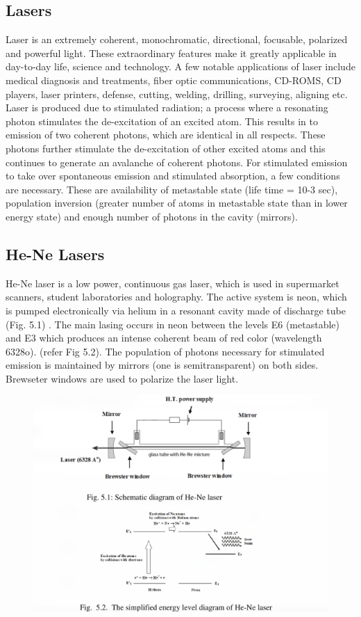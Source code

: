 \documentclass[11pt]{article}
\begin{document}
	\subsection{Lasers}
	Laser is an extremely coherent, monochromatic, directional, focusable, polarized and
powerful light. These extraordinary features make it greatly applicable in day-to-day life, science
and technology. A few notable applications of laser include medical diagnosis and treatments,
fiber optic communications, CD-ROMS, CD players, laser printers, defense, cutting, welding,
drilling, surveying, aligning etc.
Laser is produced due to stimulated radiation; a process where a resonating photon
stimulates the de-excitation of an excited atom. This results in to emission of two coherent
photons, which are identical in all respects. These photons further stimulate the de-excitation of
other excited atoms and this continues to generate an avalanche of coherent photons. For
stimulated emission to take over spontaneous emission and stimulated absorption, a few
conditions are necessary. These are availability of metastable state (life time = 10-3 sec),
population inversion (greater number of atoms in metastable state than in lower energy state) and
enough number of photons in the cavity (mirrors).

\subsection{He-Ne Lasers}

He-Ne laser is a low power, continuous gas laser, which is used in supermarket scanners, student
laboratories and holography. The active system is neon, which is pumped electronically via
helium in a resonant cavity made of discharge tube (Fig. 5.1) . The main lasing occurs in neon
between the levels E6 (metastable) and E3 which produces an intense coherent beam of red color
(wavelength 6328o). (refer Fig 5.2). The population of photons necessary for stimulated emission
is maintained by mirrors (one is semitransparent) on both sides. Brewseter windows are used to
polarize the laser light.

	\begin{figure}[H]
		\centering
		\includegraphics[scale=0.4]{1.png}
		\label{it}
	\end{figure}
	
\end{document}
